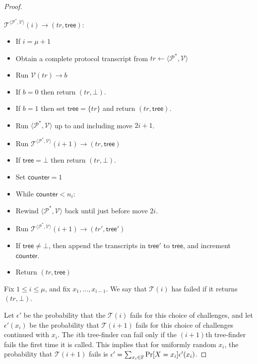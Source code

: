 \begin{proof}
\begin{description}
\item $\mathcal{T}^{\langle \mathcal{P}^*, \mathcal{V}\rangle}(i) \to (tr,\mathsf{tree})$:
\begin{itemize}
\item If $i = \mu+1$
\item \qquad Obtain a complete protocol transcript from $tr \gets \langle \mathcal{P}^*, \mathcal{V}\rangle$
\item \qquad Run $\mathcal{V}(tr) \to b$
\item \qquad If $b=0$ then return $(tr,\bot)$.
\item \qquad If $b=1$ then set $\mathsf{tree} = \{tr\}$ and return $(tr,\mathsf{tree})$.
\item Run $\langle \mathcal{P}^*, \mathcal{V}\rangle$ up to and including move $2i+1$.
\item Run $\mathcal{T}^{\langle \mathcal{P}^*, \mathcal{V}\rangle}(i+1) \to (tr,\mathsf{tree})$
\item If $\mathsf{tree}=\bot$ then return $(tr,\bot)$.

\item Set $\mathsf{counter}=1$
\item While $\mathsf{counter}< n_{i}$:
\item \qquad Rewind $\langle \mathcal{P}^*, \mathcal{V}\rangle$ back until just before move $2i$.
\item \qquad Run $\mathcal{T}^{\langle \mathcal{P}^*, \mathcal{V}\rangle}(i+1) \to (tr',\mathsf{tree}')$
\item \qquad If $\mathsf{tree} \neq \bot$, then append the transcripts in $\mathsf{tree}'$ to $\mathsf{tree}$, and increment $\mathsf{counter}$.

\item Return $(tr,\mathsf{tree})$

\end{itemize}
\end{description}

Fix $1 \leq i \leq \mu$, and fix $x_1,\ldots,x_{i-1}$. We say that $\mathcal{T}(i)$ has failed if it returns $(tr,\bot)$.

Let $\epsilon'$ be the probability that the $\mathcal{T}(i)$ fails for this choice of challenges, and let $\epsilon'(x_i)$ be the probability that $\mathcal{T}(i+1)$ fails for this choice of challenges continued with $x_i$. The $i$th tree-finder can fail only if the $(i+1)$th tree-finder fails the first time it is called. This implies that for uniformly random $x_i$, the probability that $\mathcal{T}(i+1)$ fails is $\epsilon' = \sum_{x_i \in \mathbb{F}} \Pr[X=x_i] \epsilon'(x_i)$.


\end{proof}
